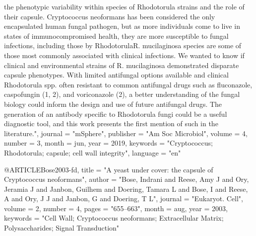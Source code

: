 {               the phenotypic variability within species of Rhodotorula strains
               and the role of their capsule. Cryptococcus neoformans has been
               considered the only encapsulated human fungal pathogen, but as
               more individuals come to live in states of immunocompromised
               health, they are more susceptible to fungal infections,
               including those by RhodotorulaR. mucilaginosa species are some
               of those most commonly associated with clinical infections. We
               wanted to know if clinical and environmental strains of R.
               mucilaginosa demonstrated disparate capsule phenotypes. With
               limited antifungal options available and clinical Rhodotorula
               spp. often resistant to common antifungal drugs such as
               fluconazole, caspofungin (1, 2), and voriconazole (2), a better
               understanding of the fungal biology could inform the design and
               use of future antifungal drugs. The generation of an antibody
               specific to Rhodotorula fungi could be a useful diagnostic tool,
               and this work presents the first mention of such in the
               literature.",
  journal   = "mSphere",
  publisher = "Am Soc Microbiol",
  volume    =  4,
  number    =  3,
  month     =  jun,
  year      =  2019,
  keywords  = "Cryptococcus; Rhodotorula; capsule; cell wall integrity",
  language  = "en"
}

@ARTICLE{Bose2003-fd,
  title    = "A yeast under cover: the capsule of Cryptococcus neoformans",
  author   = "Bose, Indrani and Reese, Amy J and Ory, Jeramia J and Janbon,
              Guilhem and Doering, Tamara L and Bose, I and Reese, A and Ory, J
              J and Janbon, G and Doering, T L",
  journal  = "Eukaryot. Cell",
  volume   =  2,
  number   =  4,
  pages    = "655--663",
  month    =  aug,
  year     =  2003,
  keywords = "Cell Wall; Cryptococcus neoformans; Extracellular Matrix;
              Polysaccharides; Signal Transduction"
}

